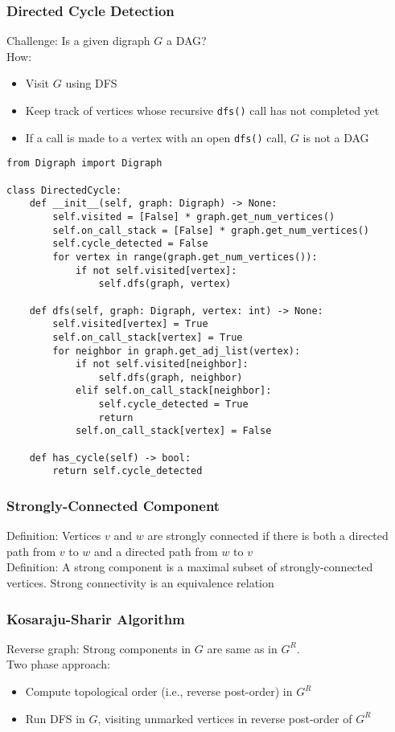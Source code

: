 \documentclass[a4paper]{article}
\begin{document}
\subsubsection*{Directed Cycle Detection}
Challenge: Is a given digraph $G$ a DAG?\\
How: 
\begin{itemize}
    \item Visit $G$ using DFS
    \item Keep track of vertices whose recursive \verb|dfs()| call has not completed yet
    \item If a call is made to a vertex with an open \verb|dfs()| call, $G$ is not a DAG
\end{itemize}

\begin{lstlisting}
from Digraph import Digraph

class DirectedCycle:
    def __init__(self, graph: Digraph) -> None:
        self.visited = [False] * graph.get_num_vertices()
        self.on_call_stack = [False] * graph.get_num_vertices()
        self.cycle_detected = False
        for vertex in range(graph.get_num_vertices()):
            if not self.visited[vertex]:
                self.dfs(graph, vertex)

    def dfs(self, graph: Digraph, vertex: int) -> None:
        self.visited[vertex] = True
        self.on_call_stack[vertex] = True
        for neighbor in graph.get_adj_list(vertex):
            if not self.visited[neighbor]:
                self.dfs(graph, neighbor)
            elif self.on_call_stack[neighbor]:
                self.cycle_detected = True
                return
            self.on_call_stack[vertex] = False

    def has_cycle(self) -> bool:
        return self.cycle_detected
\end{lstlisting}

\subsubsection*{Strongly-Connected Component}
Definition: Vertices $v$ and $w$ are strongly connected if there is both a directed path from $v$ to $w$ and a directed path from $w$ to $v$\\
Definition: A strong component is a maximal subset of strongly-connected vertices. Strong connectivity is an equivalence relation\\
\subsubsection*{Kosaraju-Sharir Algorithm}
Reverse graph: Strong components in $G$ are same as in $G^R$.\\
Two phase approach:
\begin{itemize}
    \item Compute topological order (i.e., reverse post-order) in $G^R$
    \item Run DFS in $G$, visiting unmarked vertices in reverse post-order of $G^R$
\end{itemize}
\end{document}
